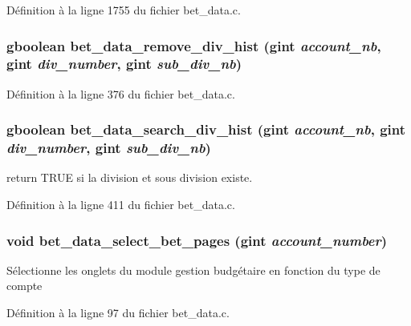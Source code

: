 Définition à la ligne 1755 du fichier bet\_\-data.c.

\subsubsection[{bet\_\-data\_\-remove\_\-div\_\-hist}]{\setlength{\rightskip}{0pt plus 5cm}gboolean bet\_\-data\_\-remove\_\-div\_\-hist (gint {\em account\_\-nb}, \/  gint {\em div\_\-number}, \/  gint {\em sub\_\-div\_\-nb})}\label{bet__data_8h_a2ad8c256ef5056925b921a71d8645578}


Définition à la ligne 376 du fichier bet\_\-data.c.

\subsubsection[{bet\_\-data\_\-search\_\-div\_\-hist}]{\setlength{\rightskip}{0pt plus 5cm}gboolean bet\_\-data\_\-search\_\-div\_\-hist (gint {\em account\_\-nb}, \/  gint {\em div\_\-number}, \/  gint {\em sub\_\-div\_\-nb})}\label{bet__data_8h_aa5a0bad0ab672a04b4dfa18d9816aa20}
return TRUE si la division et sous division existe. 

Définition à la ligne 411 du fichier bet\_\-data.c.

\subsubsection[{bet\_\-data\_\-select\_\-bet\_\-pages}]{\setlength{\rightskip}{0pt plus 5cm}void bet\_\-data\_\-select\_\-bet\_\-pages (gint {\em account\_\-number})}\label{bet__data_8h_a1056a006e9aa525d168c86363029d44e}
Sélectionne les onglets du module gestion budgétaire en fonction du type de compte 

Définition à la ligne 97 du fichier bet\_\-data.c.

